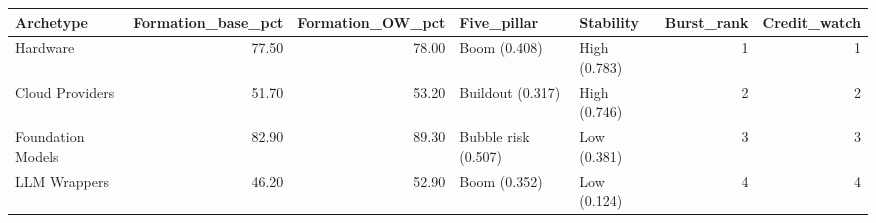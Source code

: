 \begin{tabular}{lrrllrr}
\toprule
Archetype & Formation_base_pct & Formation_OW_pct & Five_pillar & Stability & Burst_rank & Credit_watch \\
\midrule
Hardware & 77.50 & 78.00 & Boom (0.408) & High (0.783) & 1 & 1 \\
Cloud Providers & 51.70 & 53.20 & Buildout (0.317) & High (0.746) & 2 & 2 \\
Foundation Models & 82.90 & 89.30 & Bubble risk (0.507) & Low (0.381) & 3 & 3 \\
LLM Wrappers & 46.20 & 52.90 & Boom (0.352) & Low (0.124) & 4 & 4 \\
\bottomrule
\end{tabular}
